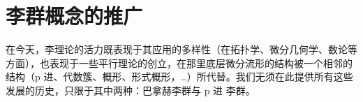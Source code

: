 \section{李群概念的推广}

在今天，李理论的活力既表现于其应用的多样性（在拓扑学、微分几何学、数论等方面），也表现于一些平行理论的创立，在那里底层微分流形的结构被一个相邻的结构（p 进、代数簇、概形、形式概形，\ldots）所代替。我们无须在此提供所有这些发展的历史，只限于其中两种：巴拿赫李群与 p 进 李群。

